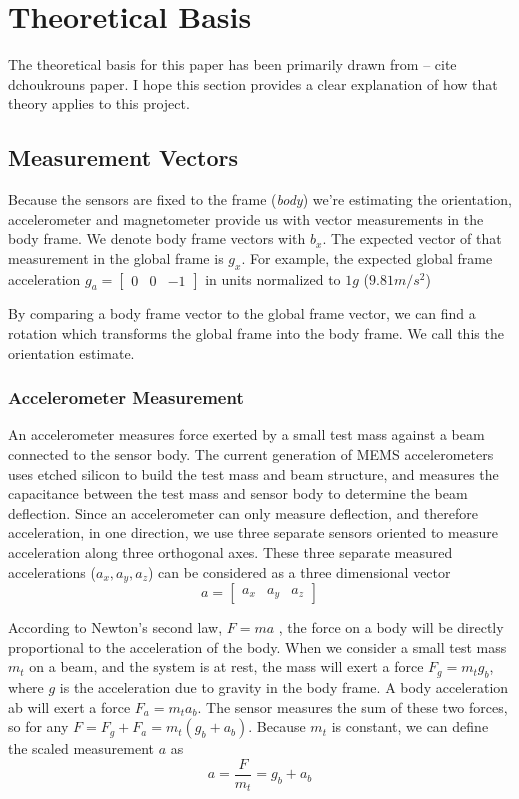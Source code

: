 \documentclass[12pt]{report}
\begin{document}
\section{Theoretical Basis}

The theoretical basis for this paper has been primarily drawn from -- cite dchoukrouns paper. I hope this section provides a clear explanation of how that theory applies to this project.

\subsection{Measurement Vectors}
Because the sensors are fixed to the frame (\emph{body}) we're estimating the orientation, accelerometer and magnetometer provide us with vector measurements in the body frame. We denote body frame vectors with $b_x$. The expected vector of that measurement in the global frame is $g_x$. For example, the expected global frame acceleration $g_a = \begin{bmatrix} 0 & 0 & -1\end{bmatrix} $ in units normalized to $1g$ ($9.81m/s^2$)

By comparing a body frame vector to the global frame vector, we can find a rotation which transforms the global frame into the body frame. We call this the orientation estimate.  

\subsubsection{Accelerometer Measurement}

An accelerometer measures force exerted by a small test mass against a beam connected to the sensor body. The current generation of MEMS accelerometers uses etched silicon to build the test mass and beam structure, and measures the capacitance between the test mass and sensor body to determine the beam deflection. Since an accelerometer can only measure deflection, and therefore acceleration, in one direction, we use three separate sensors oriented to measure acceleration along three orthogonal axes. These three separate measured accelerations ($a_x, a_y, a_z$) can be considered as a three dimensional vector 
\begin{equation} \label{eq:defa}
  a = \begin{bmatrix}a_x&a_y&a_z \end{bmatrix}
\end{equation}

According to Newton's second law, $F = m a$ , the force on a body will be directly proportional to the acceleration of the body. When we consider a small test mass $m_t$ on a beam, and the system is at rest, the mass will exert a force $F_g = m_t g_b$, where $g$ is the acceleration due to gravity in the body frame. A body acceleration ab will exert a force $F_a = m_t a_b$. The sensor measures the sum of these two forces, so for any $F = F_g + F_a = m_t ( g_b + a_b )$. Because $m_t$ is constant, we can define the scaled measurement $a$ as 
\begin{equation} \label{eq:defza}
  a = \frac{F}{m_t} = g_b + a_b
\end{equation} 
 
\end{document}
